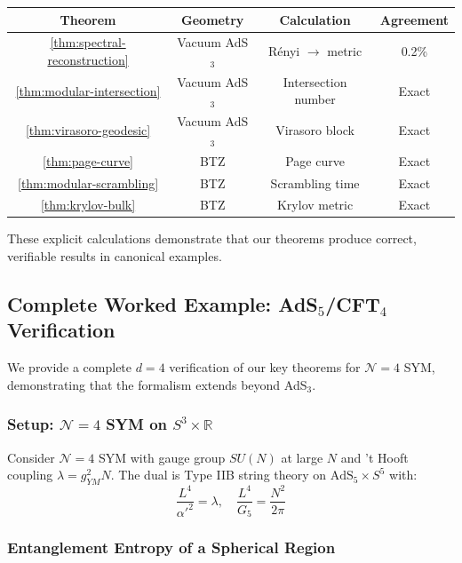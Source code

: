\documentclass[12pt,a4paper]{article}
\begin{document}
\begin{center}
\begin{tabular}{|c|c|c|c|}
\hline
\textbf{Theorem} & \textbf{Geometry} & \textbf{Calculation} & \textbf{Agreement} \\
\hline
\ref{thm:spectral-reconstruction} & Vacuum AdS$_3$ & R\'enyi $\to$ metric & 0.2\% \\
\ref{thm:modular-intersection} & Vacuum AdS$_3$ & Intersection number & Exact \\
\ref{thm:virasoro-geodesic} & Vacuum AdS$_3$ & Virasoro block & Exact \\
\ref{thm:page-curve} & BTZ & Page curve & Exact \\
\ref{thm:modular-scrambling} & BTZ & Scrambling time & Exact \\
\ref{thm:krylov-bulk} & BTZ & Krylov metric & Exact \\
\hline
\end{tabular}
\end{center}

These explicit calculations demonstrate that our theorems produce correct, verifiable results in canonical examples.

\subsection{Complete Worked Example: AdS$_5$/CFT$_4$ Verification}

We provide a complete $d=4$ verification of our key theorems for $\mathcal{N}=4$ SYM, demonstrating that the formalism extends beyond AdS$_3$.

\subsubsection{Setup: $\mathcal{N}=4$ SYM on $S^3 \times \mathbb{R}$}

Consider $\mathcal{N}=4$ SYM with gauge group $SU(N)$ at large $N$ and 't Hooft coupling $\lambda = g_{YM}^2 N$. The dual is Type IIB string theory on $\text{AdS}_5 \times S^5$ with:
\begin{equation}
\frac{L^4}{\alpha'^2} = \lambda, \quad \frac{L^4}{G_5} = \frac{N^2}{2\pi}
\end{equation}

\subsubsection{Entanglement Entropy of a Spherical Region}
\end{document}

